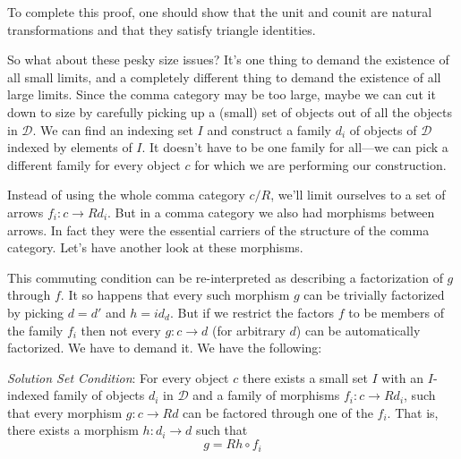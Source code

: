 \documentclass[11pt]{amsart}
\newcommand{\cat}[1]{\mathcal{#1}}
\begin{document}
To complete this proof, one should show that the unit and counit are natural transformations and that they satisfy triangle identities. 

So what about these pesky size issues? It's one thing to demand the existence of all small limits, and a completely different thing to demand the existence of all large limits. Since the comma category may be too large, maybe we can cut it down to size by carefully picking up a (small) set of objects out of all the objects in $\cat D$. We can find an indexing set $I$ and construct a family $d_i$ of objects of $\cat D$ indexed by elements of $I$. It doesn't have to be one family for all---we can pick a different family for every object $c$ for which we are performing our construction. 

Instead of using the whole comma category $c/R$, we'll limit ourselves to a set of arrows $f_i \colon c \to R d_i$. But in a comma category we also had morphisms between arrows. In fact they were the essential carriers of the structure of the comma category. Let's have another look at these morphisms.

\begin{figure}[H]
\centering
\end{figure}

This commuting condition can be re-interpreted as describing a factorization of $g$ through $f$. It so happens that every such morphism $g$ can be trivially factorized by  picking $d = d'$ and $h = id_d$. But if we restrict the factors $f$ to be members of the family $f_i$ then not every $g \colon c \to d$  (for arbitrary $d$) can be automatically factorized. We have to demand it. We have the following:

\emph{Solution Set Condition}: For every object $c$ there exists a small set $I$ with an $I$-indexed family of objects $d_i$ in $\cat D$ and a family of morphisms $f_i \colon c \to R d_i$, such that every morphism $g \colon c \to R d$ can be factored through one of the $f_i$. That is, there exists a morphism $h \colon d_i \to d$ such that
\[g = R h \circ f_i \]
\end{document}
